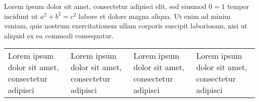 Lorem ipsum dolor sit amet, consectetur adipisci elit, sed eiusmod \(0 = 1\) tempor incidunt ut $a^{2} + b^{2} = c^{2}$ labore et dolore magna aliqua.  Ut enim ad minim veniam, quis nostrum exercitationem ullam corporis suscipit laboriosam, nisi ut aliquid ex ea commodi consequatur.

\begin{tabular}{| l | l | l | l |}
  Lorem ipsum dolor sit amet, consectetur adipisci & Lorem ipsum dolor sit amet, consectetur adipisci & Lorem ipsum dolor sit amet, consectetur adipisci & Lorem ipsum dolor sit amet, consectetur adipisci
\end{tabular}
